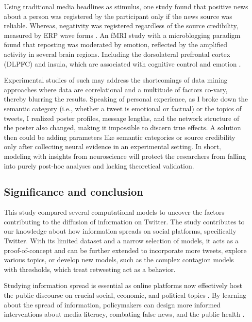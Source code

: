 \documentclass[11pt,a4paper]{article}
\begin{document}
        Using traditional media headlines as stimulus, one study found that positive news about a person was registered by the participant only if the news source was reliable. Whereas, negativity was registered regardless of the source credibility, measured by ERP wave forms \cite{baum_negative_2021}. An fMRI study with a microblogging paradigm found that reposting was moderated by emotion, reflected by the amplified activity in several brain regions. Including the dorsolateral prefrontal cortex (DLPFC) and  insula,  which are associated with cognitive control and emotion \cite{zhang_emotional_2020}. 
        
        Experimental studies of such may address the shortcomings of data mining approaches where data are correlational and a multitude of factors co-vary, thereby blurring the results. Speaking of personal experience, as I broke down the semantic category (i.e., whether a tweet is emotional or factual) or the topics of tweets, I realized poster profiles, message lengths, and the network structure of the poster also changed, making it impossible to discern true effects. A solution then could be adding parameters like semantic categories or source credibility only after collecting neural evidence in an experimental setting. In short, modeling with insights from neuroscience will protect the researchers from falling into purely post-hoc analyses and lacking theoretical validation.

    \subsection{Significance and conclusion}
    This study compared several computational models to uncover the factors contributing to the diffusion of information on Twitter. The study contributes to our knowledge about how information spreads on social platforms, specifically Twitter. With its limited dataset and a narrow selection of models, it acts as a proof-of-concept and can be further extended to incorporate more tweets, explore various topics, or develop new models, such as the complex contagion models with thresholds, which treat retweeting act as a behavior. 
    
    Studying information spread is essential as online platforms now effectively host the public discourse on crucial social, economic, and political topics \cite{lorenz-spreen_how_2020}. By learning about the spread of information, policymakers can design more informed interventions about media literacy, combating false news, and the public health \cite{edo-osagie_scoping_2020}.

\clearpage
\printbibliography

\end{document}
